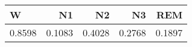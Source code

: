 \begin{tabular}{lrrrr}
\hline
W & N1 & N2 & N3 & REM \\
\hline
0.8598 & 0.1083 & 0.4028 & 0.2768 & 0.1897 \\
\hline
\end{tabular}
